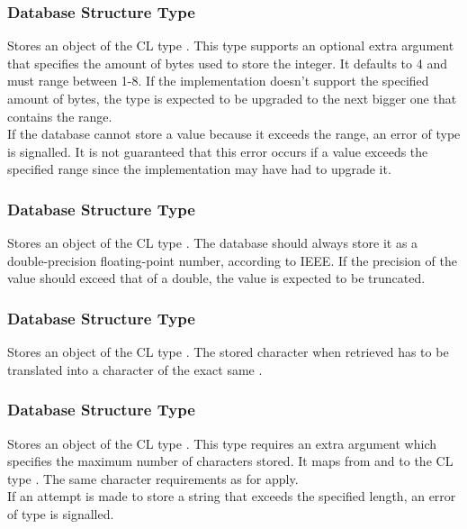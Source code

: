 \subsubsection{Database Structure Type }
Stores an object of the CL type . This type supports an optional extra argument that specifies the amount of bytes used to store the integer. It defaults to 4 and must range between 1-8. If the implementation doesn't support the specified amount of bytes, the type is expected to be upgraded to the next bigger one that contains the range. \\

\noindent If the database cannot store a value because it exceeds the range, an error of type  is signalled. It is not guaranteed that this error occurs if a value exceeds the specified range since the implementation may have had to upgrade it.

\subsubsection{Database Structure Type }
Stores an object of the CL type . The database should always store it as a double-precision floating-point number, according to IEEE. If the precision of the value should exceed that of a double, the value is expected to be truncated.

\subsubsection{Database Structure Type }
Stores an object of the CL type . The stored character when retrieved has to be translated into a character of the exact same .

\subsubsection{Database Structure Type }
Stores an object of the CL type . This type requires an extra argument which specifies the maximum number of characters stored. It maps from and to the CL type . The same character requirements as for  apply. \\

\noindent If an attempt is made to store a string that exceeds the specified length, an error of type  is signalled.


